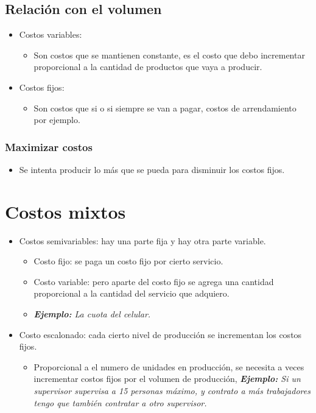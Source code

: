 \subsection{Relación con el volumen}
\begin{itemize}
    \item Costos variables:
        \begin{itemize}
            \item Son costos que  se mantienen constante, es el costo que debo incrementar proporcional a la cantidad de productos que vaya a producir.
        \end{itemize}
    
    \item Costos fijos:
        \begin{itemize}
            \item Son costos que si o si siempre se van a pagar, costos de arrendamiento por ejemplo.
        \end{itemize}
\end{itemize}

\subsubsection{Maximizar costos}
\begin{itemize}
    \item Se intenta producir lo más que se pueda para disminuir los costos fijos.
\end{itemize}

\section{Costos mixtos}
\begin{itemize}
    \item Costos semivariables: hay una parte fija y hay otra parte variable.
        \begin{itemize}
            \item Costo fijo: se paga un costo fijo por cierto servicio.
            \item Costo variable: pero aparte del costo fijo se agrega una cantidad proporcional a la cantidad del servicio que adquiero.
            \item \emph{\textbf{Ejemplo: }La cuota del celular.}
        \end{itemize}
    
    \item Costo escalonado: cada cierto nivel de producción se incrementan los costos fijos.
        \begin{itemize}
            \item Proporcional a el numero de unidades en producción, se necesita a veces incrementar costos fijos por el volumen de producción, \emph{\textbf{Ejemplo: }Si un supervisor supervisa a 15 personas máximo, y contrato a más trabajadores tengo que también contratar a otro supervisor.}
        \end{itemize}
\end{itemize}

